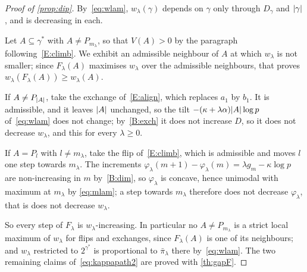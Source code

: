 \begin{proof}[Proof of \cref{prop:dip}]
    By~\eqref{eq:wlam}, $w_\lambda(\gamma)$ depends on $\gamma$ only through
    $D_\gamma$ and $\lvert\gamma\rvert$, and is decreasing in each.

    Let $A\subseteq\gamma^{\ast}$ with $A\neq P_{m_\lambda}$, so that
    $V(A)>0$ by the paragraph following~\ref{E:climb}. We exhibit an
    admissible neighbour of $A$ at which $w_\lambda$ is not smaller; since
    $F_\lambda(A)$ maximises $w_\lambda$ over the admissible neighbours,
    that proves $w_\lambda(F_\lambda(A))\geq w_\lambda(A)$.

    If $A\neq P_{\lvert A\rvert}$, take the exchange of~\ref{E:align}, which
    replaces $a_1$ by $b_1$. It is admissible, and it leaves $\lvert A\rvert$
    unchanged, so the tilt $-(\kappa+\lambda\alpha)\lvert A\rvert\log p$
    of~\eqref{eq:wlam} does not change; by~\ref{B:exch} it does not increase
    $D$, so it does not decrease $w_\lambda$, and this for every
    $\lambda\geq0$.

    If $A=P_l$ with $l\neq m_\lambda$, take the flip of~\ref{E:climb},
    which is admissible and moves $l$ one step towards $m_\lambda$. The
    increments $\varphi_\lambda(m+1)-\varphi_\lambda(m)=\lambda g_m-\kappa
    \log p$ are non-increasing in $m$ by~\ref{B:dim}, so $\varphi_\lambda$
    is concave, hence unimodal with maximum at $m_\lambda$ by
    \eqref{eq:mlam}; a step towards $m_\lambda$ therefore does not decrease
    $\varphi_\lambda$, that is does not decrease $w_\lambda$.

    So every step of $F_\lambda$ is $w_\lambda$-increasing. In particular no
    $A\neq P_{m_\lambda}$ is a strict local maximum of $w_\lambda$ for flips
    and exchanges, since $F_\lambda(A)$ is one of its neighbours; and
    $w_\lambda$ restricted to $2^{\gamma^{\ast}}$ is proportional to
    $\bar\pi_\lambda$ there by~\eqref{eq:wlam}.
    The two remaining claims of~\eqref{eq:kappapath2} are proved with
    \cref{th:gapF}.
\end{proof}

